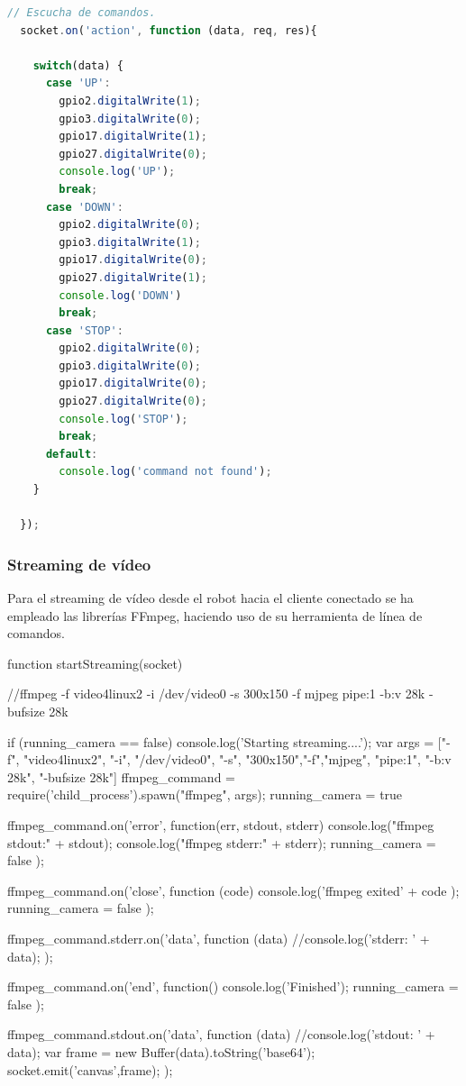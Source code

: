 \begin{lstlisting}[language=JavaScript]
  // Escucha de comandos.
  socket.on('action', function (data, req, res){

    switch(data) {
      case 'UP':
        gpio2.digitalWrite(1);
        gpio3.digitalWrite(0);
        gpio17.digitalWrite(1);
        gpio27.digitalWrite(0);
        console.log('UP');
        break;
      case 'DOWN':
        gpio2.digitalWrite(0);
        gpio3.digitalWrite(1);
        gpio17.digitalWrite(0);
        gpio27.digitalWrite(1);
        console.log('DOWN')
        break;
      case 'STOP':
        gpio2.digitalWrite(0);
        gpio3.digitalWrite(0);
        gpio17.digitalWrite(0);
        gpio27.digitalWrite(0);
        console.log('STOP');
        break;
      default:
        console.log('command not found');
    }

  });
\end{lstlisting}



\subsubsection{ Streaming de vídeo }



Para el streaming de vídeo desde el robot hacia el cliente conectado se ha empleado las librerías FFmpeg, haciendo uso de su herramienta de línea de comandos.


function startStreaming(socket) {
  //ffmpeg -f video4linux2 -i /dev/video0 -s 300x150 -f mjpeg pipe:1 -b:v 28k -bufsize 28k

  if (running_camera == false){
    console.log('Starting streaming....');
    var args = ["-f", "video4linux2", "-i", "/dev/video0", "-s", "300x150","-f","mjpeg", "pipe:1", "-b:v 28k", "-bufsize 28k"]
    ffmpeg_command = require('child_process').spawn("ffmpeg", args);
    running_camera = true
  }

  ffmpeg_command.on('error', function(err, stdout, stderr) {
    console.log("ffmpeg stdout:\n" + stdout);
    console.log("ffmpeg stderr:\n" + stderr);
    running_camera = false
  });


  ffmpeg_command.on('close', function (code) {
    console.log('ffmpeg exited' + code );
    running_camera = false
  });


  ffmpeg_command.stderr.on('data', function (data) {
    //console.log('stderr: ' + data);
  });

  ffmpeg_command.on('end', function() {
    console.log('Finished');
    running_camera = false
  });

  ffmpeg_command.stdout.on('data', function (data) {
    //console.log('stdout: ' + data);
    var frame = new Buffer(data).toString('base64');
    socket.emit('canvas',frame);
  });

}





